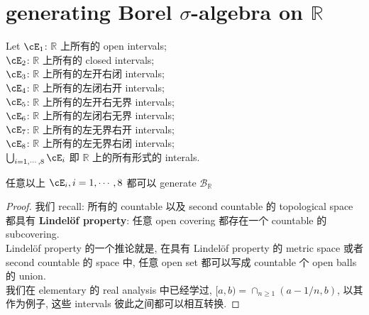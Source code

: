 \documentclass[lang=cn,11pt]{elegantbook}
\begin{document}
\section{generating Borel $\sigma$-algebra on $\mathbb{R}$}
\begin{example}
    Let
    $\cE_1 $: $\mathbb{R}$ 上所有的 open intervals; \\ 
    $\cE_2 $: $\mathbb{R}$ 上所有的 closed intervals;\\
    $\cE_3 $: $\mathbb{R}$ 上所有的左开右闭 intervals;\\
    $\cE_4 $: $\mathbb{R}$ 上所有的左闭右开 intervals;\\
    $\cE_5 $: $\mathbb{R}$ 上所有的左开右无界 intervals;\\
    $\cE_6 $: $\mathbb{R}$ 上所有的左闭右无界 intervals;\\
    $\cE_7 $: $\mathbb{R}$ 上所有的左无界右开 intervals;\\
    $\cE_8 $: $\mathbb{R}$ 上所有的左无界右闭 intervals;\\
    $\bigcup_{i=1,\cdots,8}\cE_i$ 即 $\mathbb{R}$ 上的所有形式的 interals.
\begin{lemma}
    任意以上 $\cE_i, i=1,\cdots,8$ 都可以 generate $\mathcal{B}_{\mathbb{R}}$
\end{lemma}
\begin{proof}
    我们 recall: 所有的 countable 以及 second countable 的 topological space 都具有 \textbf{Lindelöf property}: 任意 open covering 都存在一个 countable 的 subcovering.\\
    Lindelöf property 的一个推论就是, 在具有 Lindelöf property 的 metric space 或者 second countable 的 space 中, 任意 open set 都可以写成 countable 个 open balls 的 union.\\
    我们在 elementary 的 real analysis 中已经学过, $[a,b) = \cap_{n \geq 1}(a-1/n, b)$, 以其作为例子, 这些 intervals 彼此之间都可以相互转换.
\end{proof}
\end{example}
\end{document}
